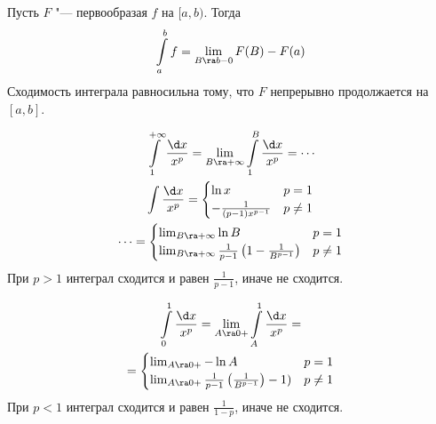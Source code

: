\begin{Rem}
	Пусть $F$ "--- первообразая $f$ на $[a, b)$.
	Тогда
	\[ \int\limits_a^b f = \lim_{B \ra b-0} F(B) - F(a) \]
	Сходимость интеграла равносильна тому, что $F$ непрерывно продолжается на $[a, b]$.
\end{Rem}

\begin{exmp}
	\begin{gather*}
		\int\limits_1^{+\infty} \frac{\d x}{x^p} = \lim_{B \ra +\infty} \int\limits_1^B \frac{\d x}{x^p} = \cdots \\
		\int \frac{\d x}{x^p} = \begin{cases}
			\ln x & p = 1 \\
			-\frac1{(p-1)x^{p-1}} & p \ne 1
		\end{cases} \\
		\cdots = \begin{cases}
			\lim_{B \ra +\infty} \ln B & p = 1 \\
			\lim_{B \ra +\infty} \frac1{p-1}\left(1-\frac1{B^{p-1}}\right) & p \ne 1
		\end{cases}
	\end{gather*}
	При $p > 1$ интеграл сходится и равен $\frac1{p - 1}$, иначе не сходится.
\end{exmp}

\begin{exmp}
	\begin{gather*}
		\int\limits_0^1 \frac{\d x}{x^p} = \lim_{A \ra 0+} \int\limits_A^1 \frac{\d x}{x^p} = \\
		= \begin{cases}
			\lim_{A \ra 0+} -\ln A & p = 1 \\
			\lim_{A \ra 0+} \frac1{p-1}\left(\frac1{B^{p-1}}\right)-1) & p \ne 1
		\end{cases}
	\end{gather*}
	При $p < 1$ интеграл сходится и равен $\frac1{1 - p}$, иначе не сходится.
\end{exmp}

